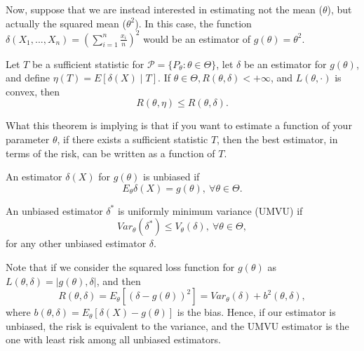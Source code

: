 Now, suppose that we are instead interested in estimating not the mean ($\theta$),
but actually the squared mean ($\theta^2$). In this case, the function
$\delta(X_1,...,X_n) = \left(
	\sum^n_{i=1}\frac{x_i}{n}
	\right)^2$ would be an estimator of $g(\theta) = \theta^2$.

\begin{theorem}
	Let $T$ be a sufficient statistic for
	$\mathcal P=\{P_\theta: \theta \in \Theta\}$, let $\delta$ be an
	estimator for $g(\theta)$, and define $\eta(T) = E[\delta(X) \mid T]$.
	If $\theta \in \Theta, R(\theta,\delta)<+\infty$, and
	$L(\theta, \cdot)$ is convex, then
	\begin{equation}
		R(\theta,\eta) \leq R(\theta, \delta).
	\end{equation}

	What this theorem is implying is that if you want to estimate a function
	of your parameter $\theta$, if there exists a sufficient statistic $T$, then
	the best estimator, in terms of the risk, can be written as a function of
	$T$.
\end{theorem}

\begin{definition}
	An estimator $\delta(X)$ for $g(\theta)$ is unbiased if
	\begin{equation}
		E_\theta \delta(X) = g(\theta), \ \forall \theta \in \Theta.
	\end{equation}
\end{definition}

\begin{definition}[UMVU]
	An unbiased estimator $\delta^*$ is uniformly minimum variance (UMVU) if
	\begin{equation}
		Var_\theta(\delta^*) \leq V_\theta(\delta), \ \forall \theta \in \Theta,
	\end{equation}
	for any other unbiased estimator $\delta$.
\end{definition}
Note that if we consider the squared loss function for $g(\theta)$ as
$L(\theta,\delta) = |g(\theta), \delta|$, and then
\begin{equation}
	R(\theta,\delta) = E_\theta[(\delta - g(\theta))^2] = Var_\theta(\delta) + b^2(\theta,\delta),
\end{equation}
where $b(\theta,\delta) = E_\theta[\delta(X) - g(\theta)]$ is the bias. Hence, if our estimator
is unbiased, the risk is equivalent to the variance, and the UMVU estimator is the one with
least risk among all unbiased estimators.

